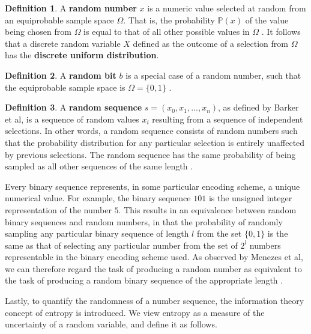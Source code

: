 \documentclass[12pt, titlepage]{report}
\theoremstyle{definition}
\newtheorem{definition}{Definition}
\begin{document}
\begin{definition}
A \textbf{random number} $x$ is a numeric value selected at random from an equiprobable sample space $\Omega$. That is, the probability $\mathbb{P}(x)$ of the value being chosen from $\Omega$ is equal to that of all other possible values in $\Omega$ \cite[p. 7]{barker2007recommendation} \cite[s. 1.1.1]{rukhin2001statistical}. It follows that a discrete random variable $X$ defined as the outcome of a selection from $\Omega$ has the \textbf{discrete uniform distribution}.
\end{definition}

\begin{definition}
A \textbf{random bit} $b$ is a special case of a random number, such that the equiprobable sample space is $\Omega = \{0, 1\}$ \cite[s. 1.1.1]{rukhin2001statistical}.
\end{definition}

\begin{definition}
A \textbf{random sequence} $s = (x_0, x_1, ..., x_n)$, as defined by Barker et al, is a sequence of random values $x_i$ resulting from a sequence of independent selections. In other words, a random sequence consists of random numbers such that the probability distribution for any particular selection is entirely unaffected by previous selections. The random sequence has the same probability of being sampled as all other sequences of the same length \cite[p. 7]{barker2007recommendation} \cite[s. 1.1.1]{rukhin2001statistical}.
\end{definition}

Every binary sequence represents, in some particular encoding scheme, a unique numerical value. For example, the binary sequence $101$ is the unsigned integer representation of the number $5$. This results in an equivalence between random binary sequences and random numbers, in that the probability of randomly sampling any particular binary sequence of length $l$ from the set $\{0, 1\}$ is the same as that of selecting any particular number from the set of $2^l$ numbers representable in the binary encoding scheme used. As observed by Menezes et al, we can therefore regard the task of producing a random number as equivalent to the task of producing a random binary sequence of the appropriate length \cite[p. 170]{menezes1996handbook}.

Lastly, to quantify the randomness of a number sequence, the information theory concept of entropy is introduced. We view entropy as a measure of the uncertainty of a random variable, and define it as follows.
\end{document}
